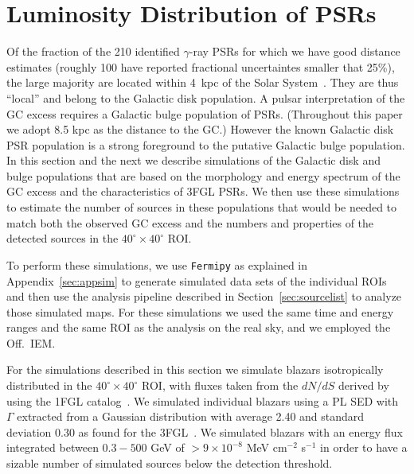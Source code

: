 \documentclass[iop]{emulateapj}
\begin{document}

\section{Luminosity Distribution of PSRs}
\label{sec:lumi_dist}

Of the fraction of the 210 identified $\gamma$-ray PSRs for
which we have good distance estimates (roughly 100 have
  reported fractional uncertaintes smaller that 25\%), the large majority are located
within 4~kpc of the Solar System~\citep[see, e.g., Figure 3
of][]{2013ApJS..208...17A}.  They are thus ``local'' and belong to the
Galactic disk population.  A pulsar interpretation of the GC excess
requires a Galactic bulge population of PSRs.  (Throughout this paper
we adopt 8.5 kpc as the distance to the GC.)  However the known
Galactic disk PSR population is a strong foreground to the putative
Galactic bulge population.  In this section and the next we describe
simulations of the Galactic disk and bulge populations that are based
on the morphology and energy spectrum of the GC excess and the
characteristics of 3FGL PSRs.  We then use these simulations to
estimate the number of sources in these populations that would be
needed to match both the observed GC excess and the numbers and
properties of the detected sources in the $40^\circ \times 40^\circ$
ROI.

To perform these simulations, we use {\tt Fermipy} as explained in
Appendix~\ref{sec:appsim} to generate simulated data sets of the
individual ROIs and then use the analysis pipeline described in
Section~\ref{sec:sourcelist} to analyze those simulated maps.  For these
simulations we used the same time and energy ranges and the same ROI as
the analysis on the real sky, and we employed the Off.~IEM.

For the simulations described in this section we simulate blazars
isotropically distributed in the $40^{\circ}\times40^{\circ}$ ROI,
with fluxes taken from the $dN/dS$ derived
by~\citet{2010ApJ...720..435A} using the 1FGL
catalog~\citep{2010ApJS..188..405A}.  We simulated individual blazars
using a PL SED with $\Gamma$ extracted from a Gaussian distribution
with average 2.40 and standard deviation 0.30 as found for the
3FGL~\citep{2015ApJS..218...23A}.  We simulated blazars with 
an energy flux integrated between $0.3-500$ GeV of $>9\times 10^{-8}$ MeV cm$^{-2}$ s$^{-1}$
in order to have a sizable number of simulated sources below the detection threshold.
\end{document}
